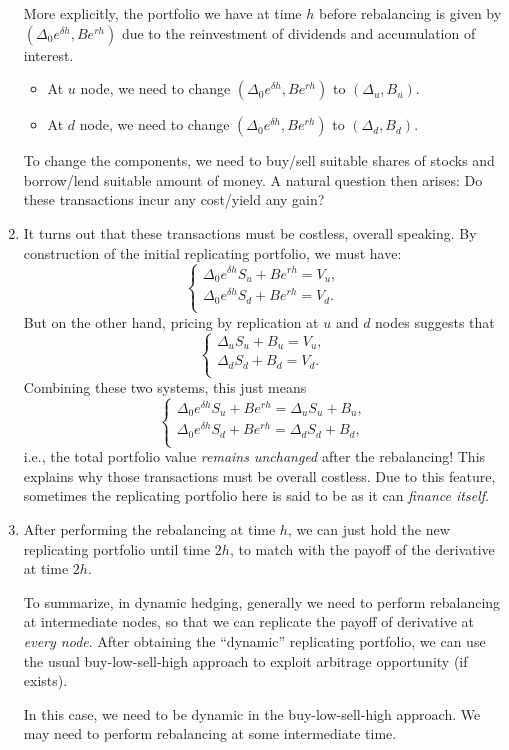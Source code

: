 \begin{enumerate}
More explicitly, the portfolio we have at time \(h\) before rebalancing is
given by \((\Delta_0e^{\delta h},Be^{rh})\) due to the reinvestment of
dividends and accumulation of interest.
\begin{itemize}
\item At \(u\) node, we need to change \((\Delta_0e^{\delta h},Be^{rh})\) to \((\Delta_u,B_u)\).
\item At \(d\) node, we need to change \((\Delta_0e^{\delta h},Be^{rh})\) to \((\Delta_d,B_d)\).
\end{itemize}
To change the components, we need to buy/sell suitable shares of stocks and
borrow/lend suitable amount of money. A natural question then arises: Do these
transactions incur any cost/yield any gain?

\item It turns out that these transactions must be costless, overall speaking. By construction of
the initial replicating portfolio, we must have:
\[
\begin{cases}
\Delta_0e^{\delta h}S_u+Be^{rh}=V_u,\\
\Delta_0e^{\delta h}S_d+Be^{rh}=V_d.\\
\end{cases}
\]
But on the other hand, pricing by replication at \(u\)
and \(d\) nodes suggests that
\[
\begin{cases}
\Delta_u S_u+B_u=V_u,\\
\Delta_d S_d+B_d=V_d.\\
\end{cases}
\]
Combining these two systems, this just means
\[
\begin{cases}
\Delta_0e^{\delta h}S_u+Be^{rh}=\Delta_u S_u+B_u,\\
\Delta_0e^{\delta h}S_d+Be^{rh}=\Delta_d S_d+B_d,\\
\end{cases}
\]
i.e., the total portfolio value \emph{remains unchanged} after the rebalancing!
This explains why those transactions must be overall costless.  Due to this
feature, sometimes the replicating portfolio here is said to be
 as it can \emph{finance itself}.

\item After performing the rebalancing at time \(h\), we can just hold the new
replicating portfolio until time \(2h\), to match with the payoff of the
derivative at time \(2h\).

To summarize, in dynamic hedging, generally we need to perform rebalancing at
intermediate nodes, so that we can replicate the payoff of derivative at
\emph{every node}. After obtaining the ``dynamic'' replicating portfolio, we
can use the usual buy-low-sell-high approach to exploit arbitrage opportunity
(if exists). \begin{note}
In this case, we need to be dynamic in the buy-low-sell-high approach. We may
need to perform rebalancing at some intermediate time.
\end{note}
\end{enumerate}

